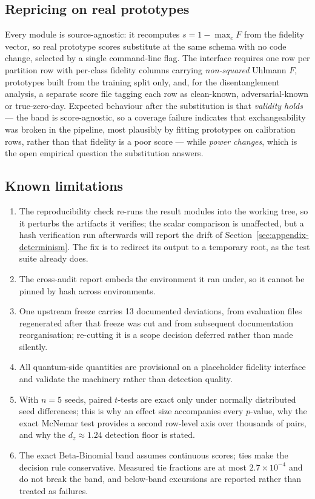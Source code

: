\subsection{Repricing on real prototypes}
\label{sec:appendix-repricing}

Every module is source-agnostic: it recomputes $s = 1 - \max_c F$ from the fidelity vector, so real
prototype scores substitute at the same schema with no code change, selected by a single command-line flag.
The interface requires one row per partition row with per-class fidelity columns carrying \emph{non-squared}
Uhlmann $F$, prototypes built from the training split only, and, for the disentanglement analysis, a
separate score file tagging each row as clean-known, adversarial-known or true-zero-day. Expected behaviour
after the substitution is that \emph{validity holds} --- the band is score-agnostic, so a coverage failure
indicates that exchangeability was broken in the pipeline, most plausibly by fitting prototypes on
calibration rows, rather than that fidelity is a poor score --- while \emph{power changes}, which is the
open empirical question the substitution answers.

\subsection{Known limitations}

\begin{enumerate}
\item The reproducibility check re-runs the result modules into the working tree, so it perturbs the
      artifacts it verifies; the scalar comparison is unaffected, but a hash verification run afterwards
      will report the drift of Section~\ref{sec:appendix-determinism}. The fix is to redirect its output to
      a temporary root, as the test suite already does.
\item The cross-audit report embeds the environment it ran under, so it cannot be pinned by hash across
      environments.
\item One upstream freeze carries 13 documented deviations, from evaluation files regenerated after that
      freeze was cut and from subsequent documentation reorganisation; re-cutting it is a scope decision
      deferred rather than made silently.
\item All quantum-side quantities are provisional on a placeholder fidelity interface and validate the
      machinery rather than detection quality.
\item With $n = 5$ seeds, paired $t$-tests are exact only under normally distributed seed differences; this
      is why an effect size accompanies every $p$-value, why the exact McNemar test provides a second
      row-level axis over thousands of pairs, and why the $d_z \approx 1.24$ detection floor is stated.
\item The exact Beta-Binomial band assumes continuous scores; ties make the decision rule conservative.
      Measured tie fractions are at most $2.7 \times 10^{-4}$ and do not break the band, and below-band
      excursions are reported rather than treated as failures.
\end{enumerate}
